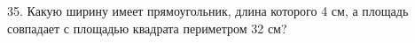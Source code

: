 35. Какую ширину имеет прямоугольник, длина которого 4 см, а площадь совпадает с площадью квадрата периметром 32 см?\\
